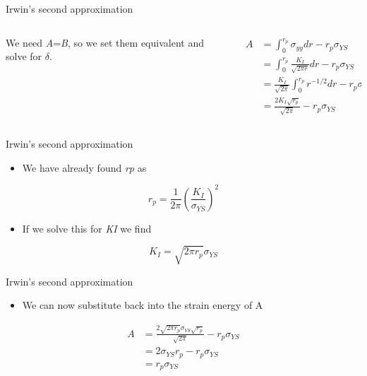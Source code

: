 \documentclass[
  letterpaper,
  ignorenonframetext,
  aspectratio=43,
  handout,
  12pt]{beamer}
\providecommand{\tightlist}{%
  \setlength{\itemsep}{0pt}\setlength{\parskip}{0pt}}
\providecommand{\tightlist}{%
\setlength{\itemsep}{0pt}\setlength{\parskip}{0pt}}
\begin{document}
\begin{frame}{Irwin's second approximation}
\protect\hypertarget{irwins-second-approximation-4}{}
\begin{columns}[T]
\begin{column}{0.5\textwidth}
We need \emph{A}=\emph{B}, so we set them equivalent and solve for
\(\delta\).
\end{column}

\begin{column}{0.5\textwidth}
\[\begin{aligned}
  A &= \int_{0}^{r_p} \sigma_{yy} dr - r_p \sigma_{YS}\\
  &= \int_{0}^{r_p} \frac{K_I}{\sqrt{2\pi r}} dr - r_p \sigma_{YS}\\
  &= \frac{K_I}{\sqrt{2\pi}}\int_{0}^{r_p} r^{-1/2} dr - r_p \sigma_{YS}\\
  &= \frac{2K_I \sqrt{r_p}}{\sqrt{2\pi}}- r_p \sigma_{YS}
\end{aligned}\]
\end{column}
\end{columns}
\end{frame}

\begin{frame}{Irwin's second approximation}
\protect\hypertarget{irwins-second-approximation-5}{}
\begin{itemize}
\tightlist
\item
  We have already found \emph{r}\emph{p} as
\end{itemize}

\[r_p = \frac{1}{2\pi} \left(\frac{K_I}{\sigma_{YS}}\right)^2\]

\begin{itemize}
\tightlist
\item
  If we solve this for \emph{K}\emph{I} we find
\end{itemize}

\[K_I = \sqrt{2\pi r_p} \sigma_{YS}\]
\end{frame}

\begin{frame}{Irwin's second approximation}
\protect\hypertarget{irwins-second-approximation-6}{}
\begin{itemize}
\tightlist
\item
  We can now substitute back into the strain energy of A
\end{itemize}

\[\begin{aligned}
  A &= \frac{2\sqrt{2\pi r_p} \sigma_{YS} \sqrt{r_p}}{\sqrt{2\pi}}- r_p \sigma_{YS}\\
  &= 2 \sigma_{YS} r_p- r_p \sigma_{YS}\\
  &= r_p \sigma_{YS}
\end{aligned}\]
\end{frame}
\end{document}
